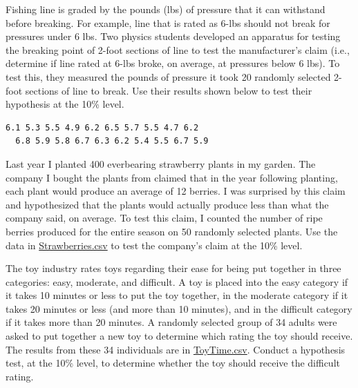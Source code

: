 \documentclass[10pt,openany]{book}\usepackage[]{graphicx}\usepackage[]{color}
\begin{document}
\newpage
\begin{exsection}
  \item \label{revex:tTestFishLine} \rhw{} Fishing line is graded by the pounds (lbs) of pressure that it can withstand before breaking.  For example, line that is rated as 6-lbs should not break for pressures under 6 lbs.  Two physics students developed an apparatus for testing the breaking point of 2-foot sections of line to test the manufacturer's claim (i.e., determine if line rated at 6-lbs broke, on average, at pressures below 6 lbs).  To test this, they measured the pounds of pressure it took 20 randomly selected 2-foot sections of line to break.  Use their results shown below to test their hypothesis at the 10\% level. 
\begin{Verbatim}[xleftmargin=5mm]
  6.1 5.3 5.5 4.9 6.2 6.5 5.7 5.5 4.7 6.2
  6.8 5.9 5.8 6.7 6.3 6.2 5.4 5.5 6.7 5.9
\end{Verbatim}

  \item \label{revex:tTestStrawberries} \rhw{} Last year I planted 400 everbearing strawberry plants in my garden.  The company I bought the plants from claimed that in the year following planting, each plant would produce an average of 12 berries.  I was surprised by this claim and hypothesized that the plants would actually produce less than what the company said, on average.  To test this claim, I counted the number of ripe berries produced for the entire season on 50 randomly selected plants.  Use the data in \href{https://raw.githubusercontent.com/droglenc/NCData/master/Strawberries.csv}{Strawberries.csv} to test the company's claim at the 10\% level. 

  \item \label{revex:tTestToyRate} \rhw{} The toy industry rates toys regarding their ease for being put together in three categories: easy, moderate, and difficult.  A toy is placed into the easy category if it takes 10 minutes or less to put the toy together, in the moderate category if it takes 20 minutes or less (and more than 10 minutes), and in the difficult category if it takes more than 20 minutes.  A randomly selected group of 34 adults were asked to put together a new toy to determine which rating the toy should receive.  The results from these 34 individuals are in \href{https://raw.githubusercontent.com/droglenc/NCData/master/ToyTime.csv}{ToyTime.csv}.  Conduct a hypothesis test, at the 10\% level, to determine whether the toy should receive the difficult rating. 


\end{exsection}
\end{document}
